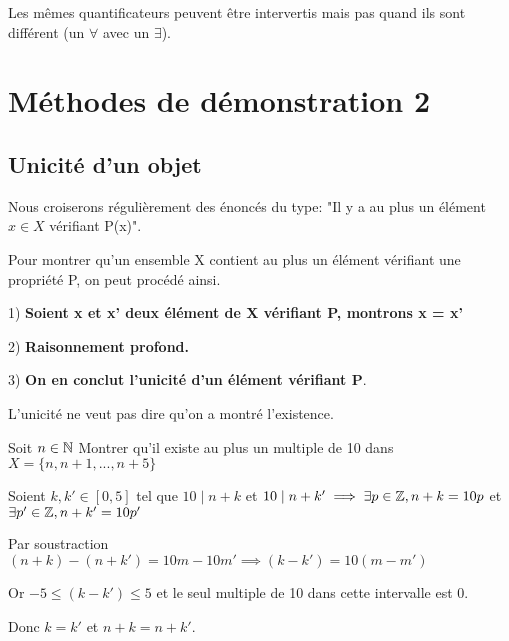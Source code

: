 \documentclass[a4paper, 12pt]{article}
\begin{document}
\begin{remark}
    Les mêmes quantificateurs peuvent être intervertis mais pas quand ils sont différent (un $\forall$ avec un $\exists$).
\end{remark}

\section{Méthodes de démonstration 2}

\subsection{Unicité d'un objet}

Nous croiserons régulièrement des énoncés du type: "Il y a au plus un élément $x \in X$ vérifiant P(x)".

\begin{methode}
    Pour montrer qu'un ensemble X contient au plus un élément vérifiant une propriété P, on peut procédé ainsi.

    \item 1) \textbf{Soient x et x' deux élément de X vérifiant P, montrons x = x'}
    \item 2) \textbf{Raisonnement profond.}
    \item 3) \textbf{On en conclut l'unicité d'un élément vérifiant P}.
\end{methode}

\begin{remark}
    L'unicité ne veut pas dire qu'on a montré l'existence.
\end{remark}


\begin{example}
    Soit $n \in \mathbb{N}$ Montrer qu'il existe au plus un multiple de 10 dans $X = \{n, n+1, ..., n+5\}$

    \vspace{1em}

    \begin{demonstration}
        Soient $k, k' \in [0, 5]$ tel que $10 \mid n+k$ et $10 \mid n+k' \implies \exists p \in \mathbb{Z}, n + k = 10p$ et $\exists p' \in \mathbb{Z}, n + k' = 10p'$
    
        Par soustraction $(n + k) - (n + k') = 10m - 10m' \implies (k - k') = 10(m - m')$

        Or $-5 \leq (k - k') \leq 5$ et le seul multiple de 10 dans cette intervalle est 0.

        \begin{rdem}
            Donc $k = k'$ et $n + k = n + k'$. %
        \end{rdem}
    \end{demonstration}
\end{example}
\end{document}
